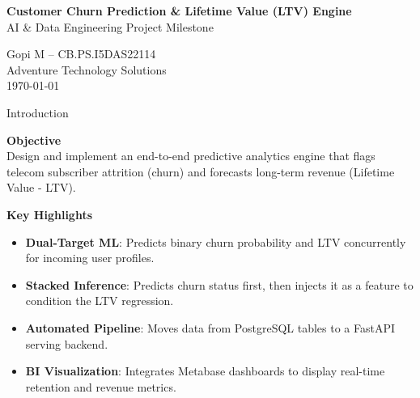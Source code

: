 \documentclass{beamer}
\begin{document}
\begin{frame}[plain]
\vspace{0.4cm}
\begin{center}
\begin{tcolorbox}[
  enhanced, colback=lavenderbg, colframe=lavenderbg,
  arc=4mm, boxrule=0pt, width=0.94\textwidth,
  halign=center, valign=center,
  drop shadow
]
{\Large\textbf{Customer Churn Prediction \& Lifetime Value (LTV) Engine}}\\[10pt]
{\large AI \& Data Engineering Project Milestone}
\end{tcolorbox}
\end{center}

\vspace{1.3cm}
\begin{center}
{\Large Gopi M -- CB.PS.I5DAS22114}\\[10pt]
{\large Adventure Technology Solutions}\\[10pt]
{\large \today}
\end{center}
\end{frame}

\begin{frame}{Introduction}

\textbf{Objective} \\
Design and implement an end-to-end predictive analytics engine that flags telecom subscriber attrition (churn) and forecasts long-term revenue (Lifetime Value - LTV).

\vspace{2pt}
\textbf{Key Highlights}
\begin{itemize}
    \item \textbf{Dual-Target ML}: Predicts binary churn probability and LTV concurrently for incoming user profiles.
    \item \textbf{Stacked Inference}: Predicts churn status first, then injects it as a feature to condition the LTV regression.
    \item \textbf{Automated Pipeline}: Moves data from PostgreSQL tables to a FastAPI serving backend.
    \item \textbf{BI Visualization}: Integrates Metabase dashboards to display real-time retention and revenue metrics.
\end{itemize}

\end{frame}
\end{document}
